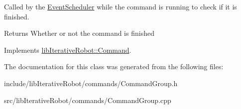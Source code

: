 Called by the \mbox{\hyperlink{classlib_iterative_robot_1_1_event_scheduler}{Event\+Scheduler}} while the command is running to check if it is finished. 

\begin{DoxyReturn}{Returns}
Whether or not the command is finished 
\end{DoxyReturn}


Implements \mbox{\hyperlink{classlib_iterative_robot_1_1_command_a8e4dccdd88f432a716090f532ba097f7}{lib\+Iterative\+Robot\+::\+Command}}.



The documentation for this class was generated from the following files\+:\begin{DoxyCompactItemize}
\item 
include/lib\+Iterative\+Robot/commands/Command\+Group.\+h\item 
src/lib\+Iterative\+Robot/commands/Command\+Group.\+cpp\end{DoxyCompactItemize}
